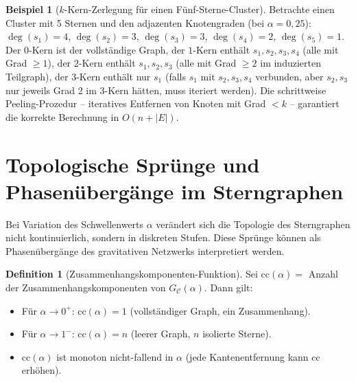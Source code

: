 ﻿\documentclass[a4paper,12pt]{report}
\theoremstyle{definition}
\newtheorem{definition}{Definition}
\newtheorem{beispiel}{Beispiel}
\begin{document}
\begin{beispiel}[$k$-Kern-Zerlegung für einen Fünf-Sterne-Cluster]
\label{bsp:kcore}
Betrachte einen Cluster mit 5 Sternen und den adjazenten Knotengraden (bei $\alpha = 0{,}25$):
$\deg(s_1) = 4$, $\deg(s_2) = 3$, $\deg(s_3) = 3$, $\deg(s_4) = 2$, $\deg(s_5) = 1$.
Der $0$-Kern ist der vollständige Graph, der $1$-Kern enthält $s_1, s_2, s_3, s_4$ (alle mit Grad $\geq 1$), der $2$-Kern enthält $s_1, s_2, s_3$ (alle mit Grad $\geq 2$ im induzierten Teilgraph), der $3$-Kern enthält nur $s_1$ (falls $s_1$ mit $s_2, s_3, s_4$ verbunden, aber $s_2, s_3$ nur jeweils Grad 2 im $3$-Kern hätten, muss iteriert werden). Die schrittweise Peeling-Prozedur -- iteratives Entfernen von Knoten mit Grad $< k$ -- garantiert die korrekte Berechnung in $O(n + |E|)$.
\end{beispiel}

\section{Topologische Sprünge und Phasenübergänge im Sterngraphen}
\label{sec:phasenuebergaenge}

Bei Variation des Schwellenwerts $\alpha$ verändert sich die Topologie des Sterngraphen nicht kontinuierlich, sondern in diskreten Stufen. Diese Sprünge können als Phasenübergänge des gravitativen Netzwerks interpretiert werden.

\begin{definition}[Zusammenhangskomponenten-Funktion]
\label{def:zusammenhang}
Sei $\mathrm{cc}(\alpha) = $ Anzahl der Zusammenhangskomponenten von $G_\mathcal{C}(\alpha)$. Dann gilt:
\begin{itemize}
    \item Für $\alpha \to 0^+$: $\mathrm{cc}(\alpha) = 1$ (vollständiger Graph, ein Zusammenhang).
    \item Für $\alpha \to 1^-$: $\mathrm{cc}(\alpha) = n$ (leerer Graph, $n$ isolierte Sterne).
    \item $\mathrm{cc}(\alpha)$ ist monoton nicht-fallend in $\alpha$ (jede Kantenentfernung kann $\mathrm{cc}$ erhöhen).
\end{itemize}
\end{definition}
\end{document}
